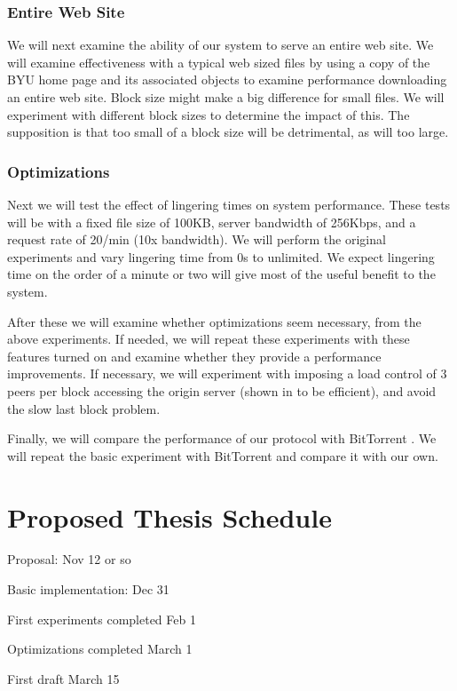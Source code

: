 \subsubsection{Entire Web Site}
We will next examine the ability of our system to serve an entire web site.  We will examine effectiveness with a typical web sized files by using a copy of the BYU home page and its associated objects to examine performance downloading an entire web site.  Block size might make a big difference for small files.  We will experiment with different block sizes to determine the impact of this.  The supposition is that too small of a block size will be detrimental, as will too large.

\subsubsection{Optimizations}
Next we will test the effect of lingering times on system performance.  These tests will be with a fixed file size of 100KB, server bandwidth of 256Kbps, and a request rate of 20/min (10x bandwidth).  We will perform the original experiments and vary lingering time from 0s to unlimited. We expect lingering time on the order of a minute or two will give most of the useful benefit to the system. %

After these we will examine whether optimizations seem necessary, from the above experiments.  If needed, we will repeat these experiments with these features turned on and examine whether they provide a performance improvements.  If necessary, we will experiment with imposing a load control of 3 peers per block accessing the origin server (shown in \cite{slurpie} to be efficient), and avoid the slow last block problem.

Finally, we will compare the performance of our protocol with BitTorrent \cite{coral}. We will repeat the basic experiment with BitTorrent and compare it with our own.

\section {Proposed Thesis Schedule}

Proposal: Nov 12 or so

Basic implementation: Dec 31

First experiments completed Feb 1

Optimizations completed March 1

First draft March 15

